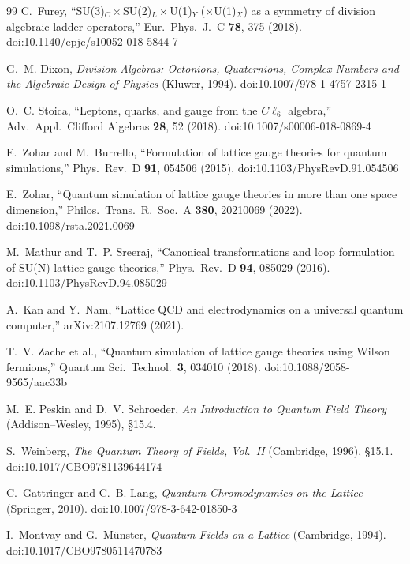 \documentclass[12pt]{article}
\begin{document}
\begin{thebibliography}{99}
C.~Furey, ``SU(3)$_C\times$SU(2)$_L\times$U(1)$_Y$ ($\times$U(1)$_X$) as a symmetry of division algebraic ladder operators,'' Eur.\ Phys.\ J.\ C \textbf{78}, 375 (2018).  doi:10.1140/epjc/s10052-018-5844-7

G.~M. Dixon, \textit{Division Algebras: Octonions, Quaternions, Complex Numbers and the Algebraic Design of Physics} (Kluwer, 1994).  doi:10.1007/978-1-4757-2315-1

O.~C. Stoica, ``Leptons, quarks, and gauge from the $C\ell_6$ algebra,'' Adv.\ Appl.\ Clifford Algebras \textbf{28}, 52 (2018).  doi:10.1007/s00006-018-0869-4

E.~Zohar and M.~Burrello, ``Formulation of lattice gauge theories for quantum simulations,'' Phys.\ Rev.\ D \textbf{91}, 054506 (2015).  doi:10.1103/PhysRevD.91.054506

E.~Zohar, ``Quantum simulation of lattice gauge theories in more than one space dimension,'' Philos.\ Trans.\ R.\ Soc.\ A \textbf{380}, 20210069 (2022).  doi:10.1098/rsta.2021.0069

M.~Mathur and T.~P. Sreeraj, ``Canonical transformations and loop formulation of SU(N) lattice gauge theories,'' Phys.\ Rev.\ D \textbf{94}, 085029 (2016).  doi:10.1103/PhysRevD.94.085029

A.~Kan and Y.~Nam, ``Lattice QCD and electrodynamics on a universal quantum computer,'' arXiv:2107.12769 (2021).  %

T.~V. Zache et al., ``Quantum simulation of lattice gauge theories using Wilson fermions,'' Quantum Sci.\ Technol.\ \textbf{3}, 034010 (2018).  doi:10.1088/2058-9565/aac33b

M.~E. Peskin and D.~V. Schroeder, \textit{An Introduction to Quantum Field Theory} (Addison--Wesley, 1995), \S15.4.

S.~Weinberg, \textit{The Quantum Theory of Fields, Vol.~II} (Cambridge, 1996), \S15.1.  doi:10.1017/CBO9781139644174

C.~Gattringer and C.~B. Lang, \textit{Quantum Chromodynamics on the Lattice} (Springer, 2010).  doi:10.1007/978-3-642-01850-3

I.~Montvay and G.~M\"unster, \textit{Quantum Fields on a Lattice} (Cambridge, 1994).  doi:10.1017/CBO9780511470783


\end{thebibliography}
\end{document}
